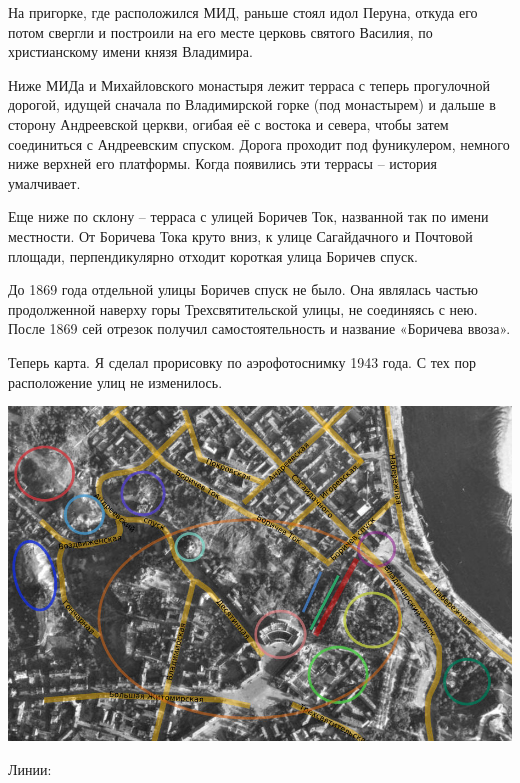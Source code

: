На пригорке, где расположился МИД, раньше стоял идол Перуна, откуда его потом свергли и построили на его месте церковь святого Василия, по христианскому имени князя Владимира.

Ниже МИДа и Михайловского монастыря лежит терраса с теперь прогулочной дорогой, идущей сначала по Владимирской горке (под монастырем) и дальше в сторону Андреевской церкви, огибая её с востока и севера, чтобы затем соединиться с Андреевским спуском. Дорога проходит под фуникулером, немного ниже верхней его платформы. Когда появились эти террасы – история умалчивает.

Еще ниже по склону – терраса с улицей Боричев Ток, названной так по имени местности. От Боричева Тока круто вниз, к улице Сагайдачного и Почтовой площади, перпендикулярно отходит короткая улица Боричев спуск.

До 1869 года отдельной улицы Боричев спуск не было. Она являлась частью продолженной наверху горы Трехсвятительской улицы, не соединяясь с нею. После 1869 сей отрезок получил самостоятельность и название «Боричева ввоза».

Теперь карта. Я сделал прорисовку по аэрофотоснимку 1943 года. С тех пор расположение улиц не изменилось.
\vspace*{\fill}
\begin{center}
\includegraphics[width=\linewidth]{chast-colebanie-osnov/uvoz-borichev/bor-karta.jpg}
\end{center}
\vspace*{\fill}
\newpage

Линии:

